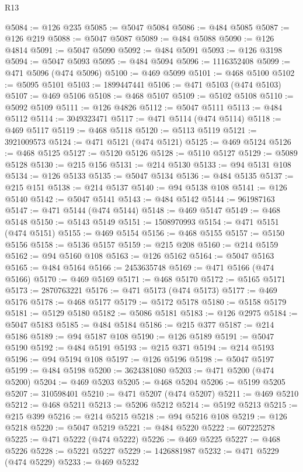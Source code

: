 \begin{lexlean}{R13}
\begin{coremodule}
@5084 := @126 @235
@5085 := @5047 @5084
@5086 := @484 @5085
@5087 := @126 @219
@5088 := @5047 @5087
@5089 := @484 @5088
@5090 := @126 @4814
@5091 := @5047 @5090
@5092 := @484 @5091
@5093 := @126 @3198
@5094 := @5047 @5093
@5095 := @484 @5094
@5096 := 1116352408
@5099 := @471 @5096 (@474 @5096)
@5100 := @469 @5099
@5101 := @468 @5100
@5102 := @5095 @5101
@5103 := 1899447441
@5106 := @471 @5103 (@474 @5103)
@5107 := @469 @5106
@5108 := @468 @5107
@5109 := @5102 @5108
@5110 := @5092 @5109
@5111 := @126 @4826
@5112 := @5047 @5111
@5113 := @484 @5112
@5114 := 3049323471
@5117 := @471 @5114 (@474 @5114)
@5118 := @469 @5117
@5119 := @468 @5118
@5120 := @5113 @5119
@5121 := 3921009573
@5124 := @471 @5121 (@474 @5121)
@5125 := @469 @5124
@5126 := @468 @5125
@5127 := @5120 @5126
@5128 := @5110 @5127
@5129 := @5089 @5128
@5130 := @215 @156
@5131 := @214 @5130
@5133 := @94 @5131 @108
@5134 := @126 @5133
@5135 := @5047 @5134
@5136 := @484 @5135
@5137 := @215 @151
@5138 := @214 @5137
@5140 := @94 @5138 @108
@5141 := @126 @5140
@5142 := @5047 @5141
@5143 := @484 @5142
@5144 := 961987163
@5147 := @471 @5144 (@474 @5144)
@5148 := @469 @5147
@5149 := @468 @5148
@5150 := @5143 @5149
@5151 := 1508970993
@5154 := @471 @5151 (@474 @5151)
@5155 := @469 @5154
@5156 := @468 @5155
@5157 := @5150 @5156
@5158 := @5136 @5157
@5159 := @215 @208
@5160 := @214 @5159
@5162 := @94 @5160 @108
@5163 := @126 @5162
@5164 := @5047 @5163
@5165 := @484 @5164
@5166 := 2453635748
@5169 := @471 @5166 (@474 @5166)
@5170 := @469 @5169
@5171 := @468 @5170
@5172 := @5165 @5171
@5173 := 2870763221
@5176 := @471 @5173 (@474 @5173)
@5177 := @469 @5176
@5178 := @468 @5177
@5179 := @5172 @5178
@5180 := @5158 @5179
@5181 := @5129 @5180
@5182 := @5086 @5181
@5183 := @126 @2975
@5184 := @5047 @5183
@5185 := @484 @5184
@5186 := @215 @377
@5187 := @214 @5186
@5189 := @94 @5187 @108
@5190 := @126 @5189
@5191 := @5047 @5190
@5192 := @484 @5191
@5193 := @215 @371
@5194 := @214 @5193
@5196 := @94 @5194 @108
@5197 := @126 @5196
@5198 := @5047 @5197
@5199 := @484 @5198
@5200 := 3624381080
@5203 := @471 @5200 (@474 @5200)
@5204 := @469 @5203
@5205 := @468 @5204
@5206 := @5199 @5205
@5207 := 310598401
@5210 := @471 @5207 (@474 @5207)
@5211 := @469 @5210
@5212 := @468 @5211
@5213 := @5206 @5212
@5214 := @5192 @5213
@5215 := @215 @399
@5216 := @214 @5215
@5218 := @94 @5216 @108
@5219 := @126 @5218
@5220 := @5047 @5219
@5221 := @484 @5220
@5222 := 607225278
@5225 := @471 @5222 (@474 @5222)
@5226 := @469 @5225
@5227 := @468 @5226
@5228 := @5221 @5227
@5229 := 1426881987
@5232 := @471 @5229 (@474 @5229)
@5233 := @469 @5232

\end{coremodule}
\end{lexlean}
